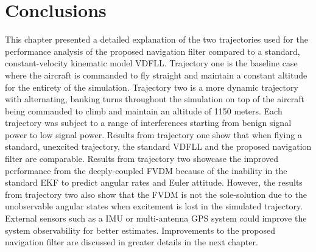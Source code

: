 

\section{\textbf{Conclusions}}

This chapter presented a detailed explanation of the two trajectories used for the performance analysis of the proposed navigation filter compared to a standard, constant-velocity kinematic model VDFLL\@. Trajectory one is the baseline case where the aircraft is commanded to fly straight and maintain a constant altitude for the entirety of the simulation. Trajectory two is a more dynamic trajectory with alternating, banking turns throughout the simulation on top of the aircraft being commanded to climb and maintain an altitude of 1150 meters. Each trajectory was subject to a range of interferences starting from benign signal power to low signal power. Results from trajectory one show that when flying a standard, unexcited trajectory, the standard VDFLL and the proposed navigation filter are comparable. Results from trajectory two showcase the improved performance from the deeply-coupled FVDM because of the inability in the standard EKF to predict angular rates and Euler attitude. However, the results from trajectory two also show that the FVDM is not the sole-solution due to the unobservable angular states when excitement is lost in the simulated trajectory. External sensors such as a IMU or multi-antenna GPS system could improve the system observability for better estimates. Improvements to the proposed navigation filter are discussed in greater details in the next chapter.
